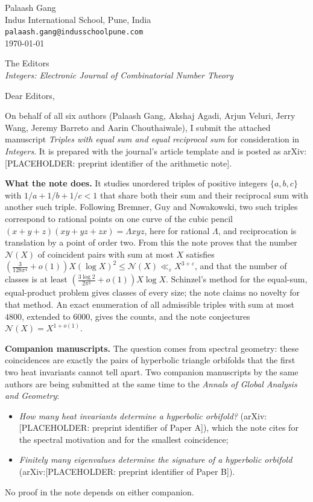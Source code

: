 \documentclass[11pt]{article}
\begin{document}
\begin{flushright}
Palaash Gang\\
Indus International School, Pune, India\\
\texttt{palaash.gang@indusschoolpune.com}\\[6pt]
\today
\end{flushright}

The Editors\\
\emph{Integers: Electronic Journal of Combinatorial Number Theory}

Dear Editors,

On behalf of all six authors (Palaash Gang, Akshaj Agadi, Arjun Veluri, Jerry Wang, Jeremy Barreto and Aarin Chouthaiwale), I submit the attached manuscript \emph{Triples with equal sum and equal reciprocal sum} for consideration in \emph{Integers}. It is prepared with the journal's article template and is posted as arXiv:[PLACEHOLDER: preprint identifier of the arithmetic note].

\textbf{What the note does.} It studies unordered triples of positive integers $\{a,b,c\}$ with $1/a+1/b+1/c<1$ that share both their sum and their reciprocal sum with another such triple. Following Bremner, Guy and Nowakowski, two such triples correspond to rational points on one curve of the cubic pencil $(x+y+z)(xy+yz+zx)=\Lambda xyz$, here for rational $\Lambda$, and reciprocation is translation by a point of order two. From this the note proves that the number $\mathcal N(X)$ of coincident pairs with sum at most $X$ satisfies $(\tfrac{3}{128\pi^4}+o(1))X(\log X)^2\le\mathcal N(X)\ll_\varepsilon X^{3+\varepsilon}$, and that the number of classes is at least $(\tfrac{3\log2}{2\pi^2}+o(1))X\log X$. Schinzel's method for the equal-sum, equal-product problem gives classes of every size; the note claims no novelty for that method. An exact enumeration of all admissible triples with sum at most $4800$, extended to $6000$, gives the counts, and the note conjectures $\mathcal N(X)=X^{1+o(1)}$.

\textbf{Companion manuscripts.} The question comes from spectral geometry: these coincidences are exactly the pairs of hyperbolic triangle orbifolds that the first two heat invariants cannot tell apart. Two companion manuscripts by the same authors are being submitted at the same time to the \emph{Annals of Global Analysis and Geometry}:
\begin{itemize}\setlength{\itemsep}{2pt}
\item \emph{How many heat invariants determine a hyperbolic orbifold?} (arXiv:[PLACEHOLDER: preprint identifier of Paper A]), which the note cites for the spectral motivation and for the smallest coincidence;
\item \emph{Finitely many eigenvalues determine the signature of a hyperbolic orbifold} (arXiv:[PLACEHOLDER: preprint identifier of Paper B]).
\end{itemize}
No proof in the note depends on either companion.
\end{document}
